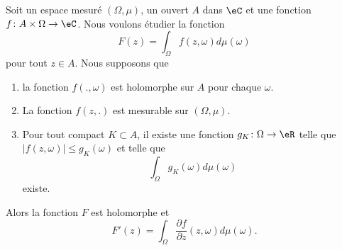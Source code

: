 \begin{theorem} \label{ThopCLOVN}
	Soit un espace mesuré \( (\Omega,\mu)\), un ouvert \( A\) dans \( \eC\) et une fonction \( f\colon A\times \Omega\to \eC\). Nous voulons étudier la fonction
	\begin{equation}
		F(z)=\int_{\Omega}f(z,\omega)d\mu(\omega)
	\end{equation}
	pour tout \( z\in A\). Nous supposons que
	\begin{enumerate}
		\item
		      la fonction \( f(.,\omega)\) est holomorphe sur \( A\) pour chaque \( \omega\).
		\item
		      La fonction \( f(z,.)\) est mesurable sur \( (\Omega,\mu)\).
		\item
		      Pour tout compact \( K\subset A\), il existe une fonction \( g_K\colon \Omega\to \eR\) telle que \( | f(z,\omega) |\leq g_K(\omega)\) et telle que
		      \begin{equation}        \label{EQooYILMooAlBQof}
			      \int_{\Omega}g_K(\omega)d\mu(\omega)
		      \end{equation}
		      existe.
	\end{enumerate}
	Alors la fonction \( F\) est holomorphe et
	\begin{equation}
		F'(z)=\int_{\Omega}\frac{ \partial f }{ \partial z }(z,\omega)d\mu(\omega).
	\end{equation}
\end{theorem}

